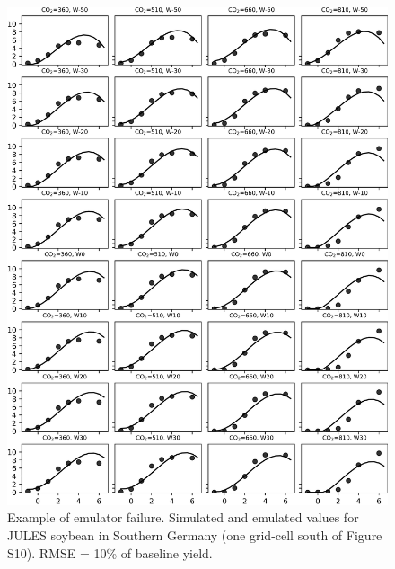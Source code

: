 \documentclass[10pt]{article}
\begin{document}
\begin{figure}[h!]
\includegraphics[width=\textwidth]{jules_soy_southern_germany.png}
\caption{Example of emulator failure. Simulated and emulated values for JULES soybean in Southern Germany (one grid-cell south of Figure S10). RMSE = 10\% of baseline yield.}
\label{fig:lpjmlrice}
\end{figure}
\end{document}
